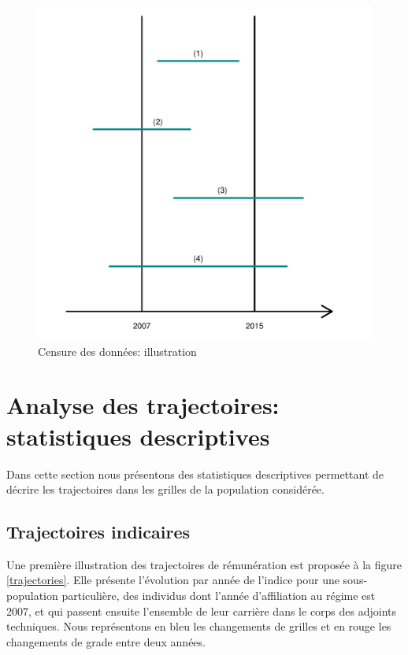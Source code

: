 \documentclass[11pt,a4paper]{article}
\begin{document}
\begin{figure}[H] 
  \caption{Censure des données: illustration}
  \label{censure} 
    \includegraphics[scale = 0.5]{schema_censoring.pdf} 
\end{figure}


\section{Analyse des trajectoires: statistiques descriptives}

Dans cette section nous présentons des statistiques descriptives permettant de décrire les trajectoires dans les grilles de la population considérée. 

\subsection{Trajectoires indicaires}

Une première illustration des trajectoires de rémunération est proposée à la figure \ref{trajectories}. Elle présente l'évolution par année de l'indice pour une sous-population particulière, des individus dont l'année d'affiliation au régime est 2007, et qui passent ensuite l'ensemble de leur carrière dans le corps des adjoints techniques. Nous représentons en bleu les changements de grilles et en rouge les changements de grade entre deux années. 
\end{document}
